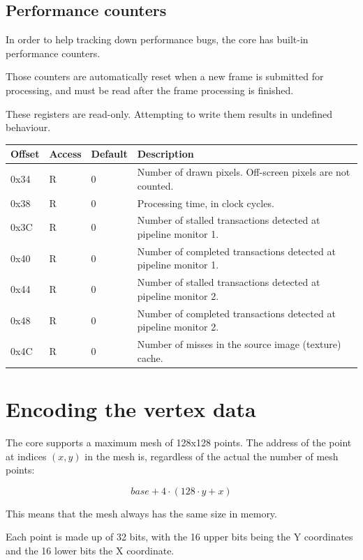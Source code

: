 \documentclass[a4paper,11pt]{article}
\begin{document}
\subsection{Performance counters}
In order to help tracking down performance bugs, the core has built-in performance counters.

Those counters are automatically reset when a new frame is submitted for processing, and must be read after the frame processing is finished.

These registers are read-only. Attempting to write them results in undefined behaviour.

\begin{tabularx}{\textwidth}{|l|l|l|X|}
\hline
\bf{Offset} & \bf{Access} & \bf{Default} & \bf{Description} \\
\hline
0x34 & R & 0 & Number of drawn pixels. Off-screen pixels are not counted. \\
\hline
0x38 & R & 0 & Processing time, in clock cycles. \\
\hline
0x3C & R & 0 & Number of stalled transactions detected at pipeline monitor 1. \\
\hline
0x40 & R & 0 & Number of completed transactions detected at pipeline monitor 1. \\
\hline
0x44 & R & 0 & Number of stalled transactions detected at pipeline monitor 2. \\
\hline
0x48 & R & 0 & Number of completed transactions detected at pipeline monitor 2. \\
\hline
0x4C & R & 0 & Number of misses in the source image (texture) cache. \\
\hline
\end{tabularx}

\section{Encoding the vertex data}
The core supports a maximum mesh of 128x128 points. The address of the point at indices $ (x, y) $ in the mesh is, regardless of the actual the number of mesh points:

\begin{equation*}
base + 4 \cdot (128 \cdot y + x)
\end{equation*}

This means that the mesh always has the same size in memory.

Each point is made up of 32 bits, with the 16 upper bits being the Y coordinates and the 16 lower bits the X coordinate.
\end{document}
